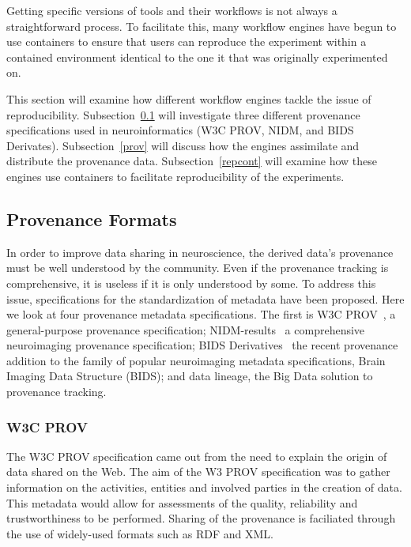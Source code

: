         Getting specific versions of tools and their workflows is not always a
        straightforward process. To facilitate this, many workflow engines have
        begun to use containers to ensure that users can reproduce the
        experiment within a contained environment identical to the one it that
        was originally experimented on. 

        This section will examine how different workflow engines tackle the
        issue of reproducibility. Subsection~\ref{metadata} will investigate three
        different provenance specifications used in neuroinformatics (W3C PROV,
        NIDM, and BIDS Derivates). Subsection~\ref{prov} will discuss how the
        engines assimilate and distribute the provenance data.
        Subsection~\ref{repcont} will examine how these engines use containers to
        facilitate reproducibility of the experiments. \subsection{Provenance
        Formats}\label{metadata} In order to improve data sharing in
        neuroscience, the derived data's provenance must be well understood by
        the community. Even if the provenance tracking is comprehensive, it is
        useless if it is only understood by some. To address this issue,
        specifications for the standardization of metadata have been proposed.
        Here we look at four provenance metadata specifications. The first is
        W3C PROV~\cite{missier2013w3c}, a general-purpose provenance
        specification; NIDM-results~\cite{Maumet:2016aa} a comprehensive
        neuroimaging provenance specification; BIDS Derivatives~\cite{bidsderiv}
        the recent provenance addition to the family of popular neuroimaging
        metadata specifications, Brain Imaging Data Structure (BIDS); and data
        lineage, the Big Data solution to provenance tracking.

            \subsubsection{W3C PROV}
            The W3C PROV specification came out from the need to explain the
            origin of data shared on the Web. The aim of the W3 PROV
            specification was to gather information on the activities, entities
            and involved parties in the creation of data. This metadata would
            allow for assessments of the quality, reliability and
            trustworthiness to be performed. Sharing of the provenance is
            faciliated through the use of widely-used formats such as RDF and
            XML. 

